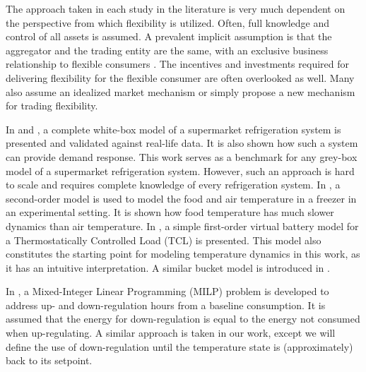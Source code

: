 \documentclass[11pt,a4paper]{article}
\begin{document}
The approach taken in each study in the literature is very much dependent on the perspective from which flexibility is utilized. Often, full knowledge and control of all assets is assumed. A prevalent implicit assumption is that the aggregator and the trading entity are the same, with an exclusive business relationship to flexible consumers \cite{gade2022ecosystem}. The incentives and investments required for delivering flexibility for the flexible consumer are often overlooked as well. Many also assume an idealized market mechanism or simply propose a new mechanism for trading flexibility.

In \cite{petersen2012eso2} and \cite{pedersen2013direct}, a complete white-box model of a supermarket refrigeration system is presented and validated against real-life data. It is also shown how such a system can provide demand response. This work serves as a  benchmark for any grey-box model of a supermarket refrigeration system. However, such an approach is hard to scale and requires complete knowledge of every refrigeration system. In \cite{pedersen2016improving}, a second-order model is used to model the food and air temperature in a freezer in an experimental setting. It is shown how food temperature has much slower dynamics than air temperature. In \cite{hao2014aggregate}, a simple first-order virtual battery model for a Thermostatically Controlled Load (TCL) is presented. This model also constitutes the starting point for modeling temperature dynamics in this work, as it has an intuitive interpretation. A similar bucket model is introduced in \cite{petersen2013taxonomy}.

In \cite{de2019leveraging}, a Mixed-Integer Linear Programming (MILP) problem  is developed to  address up- and down-regulation hours from a baseline consumption. It is assumed that the energy for down-regulation is equal to the energy not consumed when up-regulating. A similar approach is taken in our work, except we will define the use of down-regulation until the temperature state is (approximately) back to its setpoint.
\end{document}
